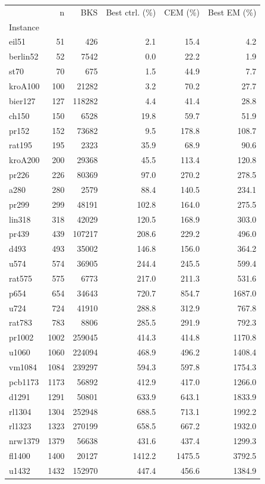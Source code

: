 \begin{tabular}{lrrrrr}
\toprule
 & n & BKS & Best ctrl. (\%) & CEM (\%) & Best EM (\%) \\
Instance &  &  &  &  &  \\
\midrule
eil51 & 51 & 426 & 2.1 & 15.4 & 4.2 \\
berlin52 & 52 & 7542 & 0.0 & 22.2 & 1.9 \\
st70 & 70 & 675 & 1.5 & 44.9 & 7.7 \\
kroA100 & 100 & 21282 & 3.2 & 70.2 & 27.7 \\
bier127 & 127 & 118282 & 4.4 & 41.4 & 28.8 \\
ch150 & 150 & 6528 & 19.8 & 59.7 & 51.9 \\
pr152 & 152 & 73682 & 9.5 & 178.8 & 108.7 \\
rat195 & 195 & 2323 & 35.9 & 68.9 & 90.6 \\
kroA200 & 200 & 29368 & 45.5 & 113.4 & 120.8 \\
pr226 & 226 & 80369 & 97.0 & 270.2 & 278.5 \\
a280 & 280 & 2579 & 88.4 & 140.5 & 234.1 \\
pr299 & 299 & 48191 & 102.8 & 164.0 & 275.5 \\
lin318 & 318 & 42029 & 120.5 & 168.9 & 303.0 \\
pr439 & 439 & 107217 & 208.6 & 229.2 & 496.0 \\
d493 & 493 & 35002 & 146.8 & 156.0 & 364.2 \\
u574 & 574 & 36905 & 244.4 & 245.5 & 599.4 \\
rat575 & 575 & 6773 & 217.0 & 211.3 & 531.6 \\
p654 & 654 & 34643 & 720.7 & 854.7 & 1687.0 \\
u724 & 724 & 41910 & 288.8 & 312.9 & 767.8 \\
rat783 & 783 & 8806 & 285.5 & 291.9 & 792.3 \\
pr1002 & 1002 & 259045 & 414.3 & 414.8 & 1170.8 \\
u1060 & 1060 & 224094 & 468.9 & 496.2 & 1408.4 \\
vm1084 & 1084 & 239297 & 594.3 & 597.8 & 1754.3 \\
pcb1173 & 1173 & 56892 & 412.9 & 417.0 & 1266.0 \\
d1291 & 1291 & 50801 & 633.9 & 643.1 & 1833.9 \\
rl1304 & 1304 & 252948 & 688.5 & 713.1 & 1992.2 \\
rl1323 & 1323 & 270199 & 658.5 & 667.2 & 1932.0 \\
nrw1379 & 1379 & 56638 & 431.6 & 437.4 & 1299.3 \\
fl1400 & 1400 & 20127 & 1412.2 & 1475.5 & 3792.5 \\
u1432 & 1432 & 152970 & 447.4 & 456.6 & 1384.9 \\
\bottomrule
\end{tabular}
